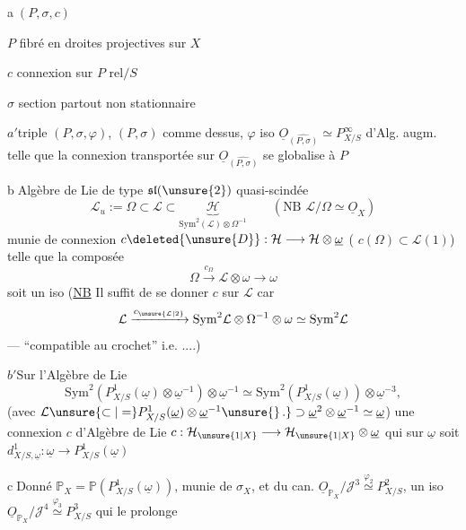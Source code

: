 \textcircled{a}\quad $(P,\sigma,c)$

$P$ fibré en droites projectives sur $X$

$c$ connexion sur $P$ rel$/S$

$\sigma$ section partout non stationnaire

\textcircled{$a'$}\quad triple $(P,\sigma,\varphi)$, $(P,\sigma)$ comme dessus,
$\varphi$ iso  $\underline O_{\widehat{(P,\sigma)}}\simeq P^\infty_{X/S}$ d'Alg. augm. telle que la connexion transportée sur $\underline O_{\widehat{(P,\sigma)}}$  se globalise à $P$

\textcircled{b}\quad Algèbre de Lie de type $\mathfrak{sl}(\unsure{2})$ quasi-scindée
\[
\mathcal L_u:=\Omega\subset\mathcal L\subset\underbrace{\mathcal H}_{\mathrm{Sym}^2(\mathcal L)\otimes\Omega^{-1}}
\qquad(\text{NB }\mathcal L/\Omega\simeq\underline O_X)
\]
munie de connexion $c\deleted{\unsure{D}}:\mathcal H\longrightarrow\mathcal H\otimes\underline\omega$
( $c(\Omega)\subset\mathcal L(1)$) telle que la composée
\[
\Omega\xrightarrow{c_\Omega}\mathcal L\otimes\omega\longrightarrow\omega
\]
soit un iso (\uline{NB} Il suffit de se donner $c$ sur $\mathcal L$  car
\[
\mathcal L\xrightarrow{c_{\unsure{\mathcal L|2}}}\mathrm{Sym}^2\mathcal L\otimes\Omega^{-1}\otimes\omega\simeq\mathrm{Sym}^2\mathcal L
\]
--- ``compatible au crochet'' i.e. ....)

\textcircled{$b'$}\quad Sur l'Algèbre de Lie 
\[
\mathrm{Sym}^2(P^1_{X/S}(\underline\omega)\otimes\underline\omega^{-1})\otimes\underline\omega^{-1}
\simeq\mathrm{Sym}^2(P^1_{X/S}(\underline\omega))\otimes\underline\omega^{-3},
\]
(avec $\mathcal L\unsure{\subset|=}P^1_{X/S}(\underline\omega)\otimes\underline\omega^{-1}\unsure{\}\,.}\supset\underline\omega^2\otimes\underline\omega^{-1}\simeq\underline\omega$)
une connexion $c$ d'Algèbre de Lie
 $c:\mathcal H_{\unsure{1|X}}\longrightarrow\mathcal H_{\unsure{1|X}}\otimes\underline\omega$
qui sur $\underline\omega$ soit $d^1_{X/S,\underline\omega}:\underline\omega\longrightarrow P^1_{X/S}(\underline\omega)$

\textcircled{c}\quad Donné $\mathbb P_X=\mathbb P(P^1_{X/S}(\underline\omega))$, munie de $\sigma_X$, et du  can.
$\underline O_{\mathbb P_X}/\mathcal J^3\overset{\varphi_2}{\simeq}P^2_{X/S}$, un iso
$\underline O_{\mathbb P_X}/\mathcal J^4\overset{\varphi_3}{\simeq}P^3_{X/S}$ qui le prolonge

